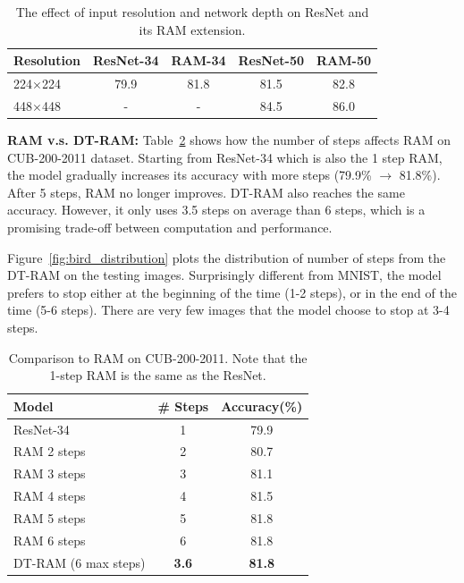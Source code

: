 \documentclass[10pt,twocolumn,letterpaper]{article}
\begin{document}
\begin{table}
  \centering
  \addtolength{\tabcolsep}{2.5pt}
    \begin{tabular}{l c c c c}
      \toprule[0.2 em]
      Resolution & ResNet-34 & RAM-34 & ResNet-50 & RAM-50 \\
      \toprule[0.2 em]
      224$\times$224 & 79.9 & 81.8 & 81.5 & 82.8 \\
      448$\times$448 & - & - & 84.5 & 86.0 \\
      \bottomrule[0.1 em]
    \end{tabular}
    \vspace{1pt}
    \caption{The effect of input resolution and network depth on ResNet and its RAM extension.}
    \label{tab:bird_resolution}
\end{table}

\textbf{RAM v.s. DT-RAM:} Table~\ref{tab:bird_ram} shows how the number of steps affects RAM on CUB-200-2011 dataset.
Starting from ResNet-34 which is also the 1 step RAM, the model gradually increases its accuracy with more steps (79.9\% $\rightarrow$ 81.8\%).
After 5 steps, RAM no longer improves.
DT-RAM also reaches the same accuracy.
However, it only uses 3.5 steps on average than 6 steps, which is a promising trade-off between computation and performance.

Figure~\ref{fig:bird_distribution} plots the distribution of number of steps from the DT-RAM on the testing images.
Surprisingly different from MNIST, the model prefers to stop either at the beginning of the time (1-2 steps), or in the end of the time (5-6 steps).
There are very few images that the model choose to stop at 3-4 steps.

\begin{table}
  \centering
  \addtolength{\tabcolsep}{2.5pt}
    \begin{tabular}{l c c}
      \toprule[0.2 em]
      Model & \# Steps & Accuracy(\%) \\
      \toprule[0.2 em]
      ResNet-34 & 1 & 79.9 \\
      RAM 2 steps & 2 & 80.7 \\
      RAM 3 steps & 3 & 81.1 \\
      RAM 4 steps & 4 & 81.5 \\
      RAM 5 steps & 5 & 81.8 \\
      RAM 6 steps & 6 & 81.8 \\
      \midrule
      DT-RAM (6 max steps) & {\bf 3.6} & {\bf 81.8} \\
      \bottomrule[0.1 em]
    \end{tabular}
    \vspace{1pt}
    \caption{Comparison to RAM on CUB-200-2011. Note that the 1-step RAM is the same as the ResNet.}
    \label{tab:bird_ram}
\end{table}
\end{document}
